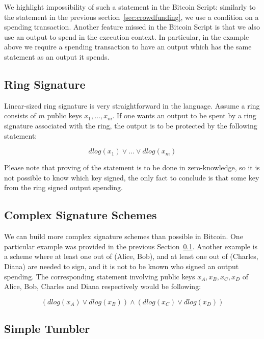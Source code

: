 \documentclass[]{llncs}
\newcommand{\authnote}[2]{\marginpar{\parbox{\marginparwidth}{\tiny %
  \textsf{#1 {\textcolor{blue}{notes: #2}}}}}%
  \textcolor{blue}{\textbf{\dag}}}
\newcommand{\authnote}[2]{
  \textsf{#1 \textcolor{blue}{: #2}}}
\newcommand{\authnote}[2]{}
\newcommand{\knote}[1]{{\authnote{\textcolor{green}{kushti notes}}{#1}}}
\begin{document}
We highlight impossibility of such a statement in the Bitcoin Script: similarly to the statement in the previous section~\ref{sec:crowdfunding}, we use a condition on a spending transaction. Another feature missed in the Bitcoin Script is that we also use an output to spend in the execution context. In particular, in the example above we require a spending transaction to have an output which has the same statement as an output it spends. 

\subsection{Ring Signature}
\label{sec:ring}

Linear-sized ring signature is very straightforward in the language. Assume a ring consists of $m$ public keys $x_1, \dots, x_m$. If one wants an output to be spent by a ring signature associated with the ring, the output is to be protected by the following statement:

$$dlog(x_1) \lor \dots \lor dlog(x_m)$$  

Please note that proving of the statement is to be done in zero-knowledge, so it is not possible to know which key signed, the only fact to conclude is that some key from the ring signed output spending. 

\subsection{Complex Signature Schemes}

We can build more complex signature schemes than possible in Bitcoin. One particular example was provided in the previous Section~\ref{sec:ring}. Another example is a scheme where at least one out of (Alice, Bob), and at least one out of (Charles, Diana) are needed to sign, and it is not to be known who signed an output spending. The corresponding statement involving public keys $x_A, x_B, x_C, x_D$ of Alice, Bob, Charles and Diana respectively would be following:

$$(dlog(x_A) \lor dlog(x_B)) \land (dlog(x_C) \lor dlog(x_D))$$

\subsection{Simple Tumbler}
\label{sec:tumbler}

\knote{does the example makes sense? check other tumbler papers. also, update the scripts, now approach is more generic than using tx.outbytes}
\end{document}
